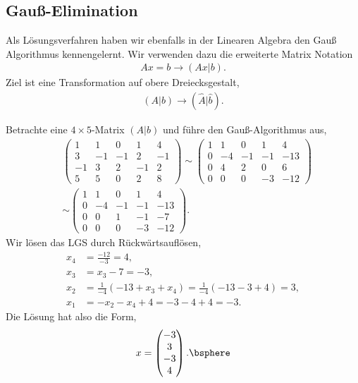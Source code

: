 \subsection{Gauß-Elimination}
Als Lösungsverfahren haben wir ebenfalls in der Linearen Algebra den Gauß
Algorithmus kennengelernt. Wir verwenden dazu die erweiterte Matrix Notation
\begin{align*}
Ax = b \rightarrow (Ax|b).
\end{align*}
Ziel ist eine Transformation auf obere Dreiecksgestalt,
\begin{align*}
(A|b) \rightarrow (\hat{A}|\hat{b}).
\end{align*}
\begin{bspn} Betrachte eine $4\times 5$-Matrix $(A|b)$ und
führe den Gauß-Algorithmus aus,
\begin{align*}
&
\left(
\begin{array}{cccc|c}
1 & 1 & 0 & 1 & 4\\
3 & -1 & -1 & 2 & -1\\
-1 & 3 & 2 & -1 & 2\\
5 & 5 & 0 & 2 & 8
\end{array}
\right)
\sim
\left(
\begin{array}{cccc|c}
1 & 1 & 0 & 1 & 4\\
0 & -4 & -1 & -1 & -13\\
0 & 4 & 2 & 0 & 6\\
0 & 0 & 0 & -3 & -12
\end{array}
\right)
\\
&\sim
\left(
\begin{array}{cccc|c}
1 & 1 & 0 & 1 & 4\\
0 & -4 & -1 & -1 & -13\\
0 & 0 & 1 & -1 & -7\\
0 & 0 & 0 & -3 & -12
\end{array}
\right).
\end{align*}
Wir lösen das LGS durch Rückwärtsauflösen,
\begin{align*}
x_4 &= \frac{-12}{-3} = 4,\\
x_3 &= x_3 - 7 = -3,\\
x_2 &= \frac{1}{-4}\left(-13+x_3+x_4\right) = \frac{1}{-4}\left(-13 - 3+4\right)
= 3,\\
x_1 &= -x_2 -x_4 + 4 = -3 - 4+4 = -3.
\end{align*}
Die Lösung hat also die Form,
\begin{align*}
x = \begin{pmatrix}
    -3 \\ 3\\ -3\\ 4
    \end{pmatrix}.\bsphere
\end{align*}
\end{bspn}

